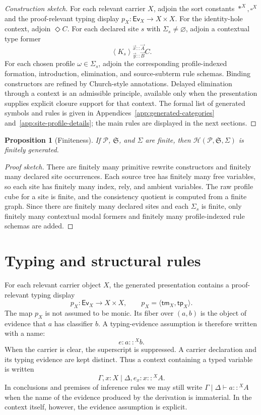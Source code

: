 \documentclass[11pt]{article}
\newcommand{\ty}{\mathrel{::}}
\newcommand{\Dia}{\Diamond}
\newcommand{\Sig}{\Sigma}
\newcommand{\Ev}{\mathsf{Ev}}
\newcommand{\tm}{\mathsf{tm}}
\newcommand{\tp}{\mathsf{tp}}
\newcommand{\Mod}[4]{\left\langle #1\right\rangle^{#2}_{#3} #4}
\newtheorem{proposition}[definition]{Proposition}
\begin{document}
\begin{proof}[Construction sketch]
For each relevant carrier \(X\), adjoin the sort constants
\(\ast^X,\square^X\) and the proof-relevant typing display
\(p_X:\Ev_X\to X\times X\).  For the identity-hole context, adjoin
\(\Dia C\).  For each declared site \(s\) with \(\Sig_s\neq\varnothing\),
adjoin a contextual type former
\[
  \Mod{K_s}{\vec x\ty\vec A}{\vec y\ty\vec B}{C}.
\]
For each chosen profile \(\omega\in\Sig_s\), adjoin the corresponding
profile-indexed formation, introduction, elimination, and source-subterm rule
schemas.  Binding constructors are refined by Church-style annotations.
Delayed elimination through a context is an admissible principle, available
only when the presentation supplies explicit closure support for that context.
The formal list of generated symbols and rules is given in
Appendices~\ref{app:generated-categories}
and~\ref{app:site-profile-details}; the main rules are displayed in the next
sections.
\end{proof}

\begin{proposition}[Finiteness]
If \(\mathcal P\), \(\mathfrak S\), and \(\Sig\) are finite, then
\(\mathcal H(\mathcal P,\mathfrak S,\Sig)\) is finitely generated.
\end{proposition}

\begin{proof}[Proof sketch]
There are finitely many primitive rewrite constructors and finitely many
declared site occurrences.  Each source tree has finitely many free variables,
so each site has finitely many index, rely, and ambient variables.  The raw
profile cube for a site is finite, and the consistency quotient is computed from
a finite graph.  Since there are finitely many declared sites and each \(\Sig_s\) is finite, only
finitely many contextual modal formers and finitely many profile-indexed rule
schemas are added.
\end{proof}


\section{Typing and structural rules}

For each relevant carrier object \(X\), the generated presentation contains a
proof-relevant typing display
\[
  p_X:\Ev_X\longrightarrow X\times X,
  \qquad
  p_X=\langle\tm_X,\tp_X\rangle .
\]
The map \(p_X\) is not assumed to be monic.  Its fiber over \((a,b)\) is
the object of evidence that \(a\) has classifier \(b\).  A typing-evidence
assumption is therefore written with a name:
\[
  e:a\ty^X b.
\]
When the carrier is clear, the superscript is suppressed.  A carrier declaration
and its typing evidence are kept distinct.  Thus a context containing a typed
variable is written
\[
  \Gamma,x:X\mid\Delta,e_x:x\ty^X A.
\]
In conclusions and premises of inference rules we may still write
\(\Gamma\mid\Delta\vdash a\ty^X A\) when the name of the evidence produced by
the derivation is immaterial.  In the context itself, however, the evidence
assumption is explicit.
\end{document}
